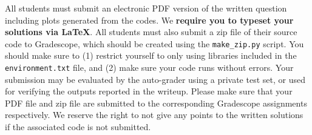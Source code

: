 All students must submit an electronic PDF version of the written question including plots generated from the codes. We
{\bf require you to typeset your solutions via \LaTeX}. 
All students must also submit a zip file of
their source code to Gradescope, which should be created using the
\texttt{make\_zip.py} script. You
should make sure to (1) restrict yourself to only using libraries included in
the
\texttt{environment.txt} file, and (2) make sure your code runs without errors.
Your submission may be evaluated by the
auto-grader using a private test set, or used for verifying the outputs reported in the writeup. Please make sure that your PDF file and zip file are submitted to the corresponding Gradescope assignments respectively. We reserve the right to not give any points to the written solutions if the associated code is not submitted.

\vspace{0.1in}
